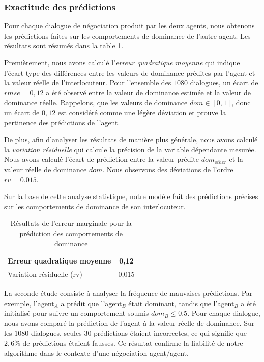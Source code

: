 	\subsubsection{Exactitude des prédictions}
	
	Pour chaque dialogue de négociation produit par les deux agents, nous obtenons les prédictions faites sur les comportements de dominance de l'autre agent. Les résultats sont résumés dans la table \ref{tab:res1}. 

	Premièrement, nous avons calculé l'\emph {erreur quadratique moyenne} qui indique l'écart-type des différences entre les valeurs de dominance prédites par l'agent et la valeur réelle de l'interlocuteur.
	Pour l'ensemble des $1080$ dialogues, un écart de $rmse = 0,12$ a été observé entre la valeur de dominance estimée et la valeur de dominance réelle. Rappelons, que les valeurs de dominance $dom \in [0,1]$, donc un écart de $0,12$ est considéré comme une légère déviation et prouve la pertinence des prédictions de l'agent. 
	
	 De plus, afin d'analyser les résultats de manière plus générale, nous avons calculé la \emph {variation résiduelle} qui calcule la précision de la variable dépendante mesurée. Nous avons calculé l'écart de prédiction entre la valeur prédite $ dom_{other} $ et la valeur réelle de dominance $dom$.
	Nous observons des déviations de l'ordre $ rv = 0.015 $.
	
	 Sur la base de cette analyse statistique, notre modèle fait des prédictions précises sur les comportements de dominance de son interlocuteur.
	
	
	\begin{table}[h]
		\centering
		\caption{Résultats de l'erreur marginale pour la prédiction des comportements de dominance} 
		\begin{tabular}{|l|c|}
			\hline
			Erreur quadratique moyenne & 0,12 \\
			\hline
			Variation résiduelle (rv) & 0,015 \\
			\hline
		\end{tabular}
		
		\label{tab:res1}
	\end{table}
	
	La seconde étude consiste à analyser la fréquence de mauvaises prédictions. 
	Par exemple, l'agent$_A$ a prédit que l'agent$_B$ était dominant, tandis que l'agent$_B$ a été initialisé pour suivre un comportement soumis $dom_B \leq 0.5$.  Pour chaque dialogue, nous avons comparé la prédiction de l'agent à la valeur réelle de dominance. Sur les $1080$ dialogues, seules $ 30 $ prédictions étaient incorrectes, ce qui signifie que $ 2,6 \% $ de prédictions étaient fausses. 
	Ce résultat confirme la fiabilité de notre algorithme dans le contexte d'une négociation agent/agent.
	
